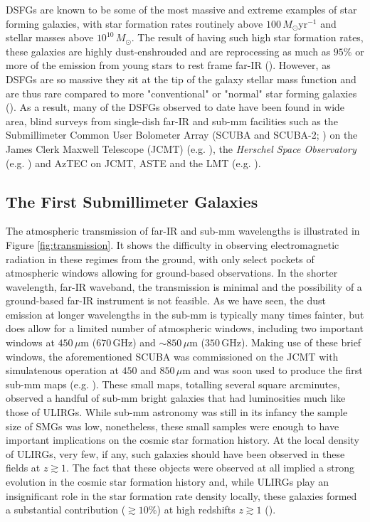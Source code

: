 DSFGs are known to be some of the most massive and extreme examples of star forming galaxies, with star formation rates routinely above $100\,M_\odot$yr$^{-1}$ and stellar masses above $10^{10}\,M_\odot$. The result of having such high star formation rates, these galaxies are highly dust-enshrouded and are reprocessing as much as $95\%$ or more of the emission from young stars to rest frame far-IR (\citealt{Blain_2002, Casey_2014b}). However, as DSFGs are so massive they sit at the tip of the galaxy stellar mass function and are thus rare compared to more "conventional" or "normal" star forming galaxies (\citealt{Chapman_2005}). As a result, many of the DSFGs observed to date have been found in wide area, blind surveys from single-dish far-IR and sub-mm facilities such as the Submillimeter Common User Bolometer Array (SCUBA and SCUBA-2; \citealt{Holland_1999, Holland_2013}) on the James Clerk Maxwell Telescope (JCMT) (e.g. \citealt{Smail_1997, Hughes_1998}), the \textit{Herschel Space Observatory} (e.g. \citealt{Eales_2010, Elbaz_2011, Oliver_2012}) and AzTEC on JCMT, ASTE and the LMT (e.g. \citealt{Scott_2008, Aretxaga_2011}).

\subsection{The First Submillimeter Galaxies}

The atmospheric transmission of far-IR and sub-mm wavelengths is illustrated in Figure \ref{fig:transmission}. It shows the difficulty in observing electromagnetic radiation in these regimes from the ground, with only select pockets of atmospheric windows allowing for ground-based observations. In the shorter wavelength, far-IR waveband, the transmission is minimal and the possibility of a ground-based far-IR instrument is not feasible. As we have seen, the dust emission at longer wavelengths in the sub-mm is typically many times fainter, but does allow for a limited number of atmospheric windows, including two important windows at $450\,\mu$m ($670\,$GHz) and $\sim 850\,\mu$m ($350\,$GHz). Making use of these brief windows, the aforementioned SCUBA was commissioned on the JCMT with simulatenous operation at $450$ and $850\,\mu$m and was soon used to produce the first sub-mm maps (e.g. \citealt{Smail_1997, Barger_1998, Hughes_1998}). These small maps, totalling several square arcminutes, observed a handful of sub-mm bright galaxies that had luminosities much like those of ULIRGs. While sub-mm astronomy was still in its infancy the sample size of SMGs was low, nonetheless, these small samples were enough to have important implications on the cosmic star formation history. At the local density of ULIRGs, very few, if any, such galaxies should have been observed in these fields at $z \gtrsim 1$. The fact that these objects were observed at all implied a strong evolution in the cosmic star formation history and, while ULIRGs play an insignificant role in the star formation rate density locally, these galaxies formed a substantial contribution ($\gtrsim 10\%$) at high redshifts $z \gtrsim 1$ (\citealt{Casey_2014b}). 

